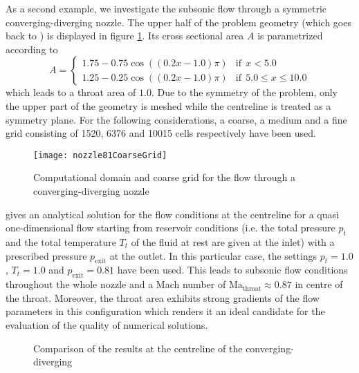 As a second example, we investigate the subsonic flow through a symmetric
converging-diverging nozzle. The upper half of the problem geometry (which goes
back to \cite{Liou1987}) is displayed in figure \ref{fig:nozzle_grid}. Its cross
sectional area $A$ is parametrized according to
\begin{equation}
	\label{eqn:parametrizationNozzle}
	A = \begin{cases}
		1.75 - 0.75 \cos((0.2 x - 1.0) \pi)
			& \mathrm{if~~} x < 5.0\\
		1.25 - 0.25 \cos((0.2 x - 1.0) \pi)
			& \mathrm{if~~} 5.0 \leq x \leq 10.0
	\end{cases}
\end{equation}
which leads to a throat area of $1.0$. Due to the symmetry of the problem, only
the upper part of the geometry is meshed while the centreline is treated as a
symmetry plane. For the following considerations, a coarse, a medium and a fine
grid consisting of 1520, 6376 and 10015 cells respectively have been used.

\begin{figure}
	\centering
	\texttt{[image: nozzle81CoarseGrid]}
	\caption{Computational domain and coarse grid for the flow through a
	converging-diverging nozzle}
	\label{fig:nozzle_grid}
\end{figure}

\cite{Anderson2002} gives an analytical solution for the flow conditions at the
centreline for a quasi one-dimensional flow starting from reservoir conditions
(i.e. the total pressure $p_t$ and the total temperature $T_t$ of the fluid at
rest are given at the inlet) with a prescribed pressure $p_\mathrm{exit}$ at the
outlet. In this particular case, the settings $p_t = 1.0$, $T_t = 1.0$ and
$p_\mathrm{exit} = 0.81$ have been used. This leads to subsonic flow conditions
throughout the whole nozzle and a Mach number of
$\mathrm{Ma}_\mathrm{throat} \approx 0.87$ in centre of the throat. Moreover,
the throat area exhibits strong gradients of the flow parameters in this
configuration which renders it an ideal candidate for the evaluation of the
quality of numerical solutions.

\begin{figure}
	\centering
	\quad
	\caption{Comparison of the results at the centreline of
		the converging-diverging}
	\label{fig:nozzle81comparison}
\end{figure}


